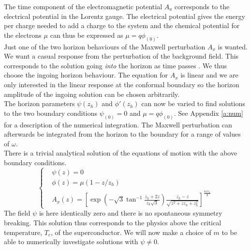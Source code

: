 \documentclass[12pt]{report}
\renewcommand{\i}{\ensuremath{i}}
\newcommand{\At}{\ensuremath{{\phi}}}
\begin{document}
The time component of the electromagnetic potential $A_a$ corresponds to the electrical potential in the Lorentz gauge. The electrical potential gives the energy per charge needed to add a charge to the system and the chemical potential for the electrons $\mu$ can thus be expressed as $\mu=q\phi_{(0)}$.\\

Just one of the two horizon behaviours of the Maxwell perturbation $A_x$ is wanted. We want a casual response from the perturbation of the background field. This corresponds to the solution going \emph{into} the horizon as time passes \cite{hartnoll8}. We thus choose the ingoing horizon behaviour. The equation for $A_x$ is linear and we are only interested in the linear response at the conformal boundary so the horizon amplitude of the ingoing solution can be chosen arbitrarily.\\

The horizon parameters $\psi(z_h)$ and $\At'(z_h)$ can now be varied to find solutions to the two boundary conditions $\psi_{(0)}=0$ and $\mu=q\phi_{(0)}$. See Appendix \ref{a:num} for a description of the numerical integration. The Maxwell perturbation can afterwards be integrated from the horizon to the boundary for a range of values of $\omega$.\\

There is a trivial analytical solution of the equations of motion with the above boundary conditions.
\begin{equation}
\begin{cases} 
 &\psi(z)=0\\
 &\phi(z)=\mu(1-z/z_h)\\
 &A_x(z)=
\left[
\exp\left( - \sqrt{3}\tan^{-1} \frac{z_h+2z}{z_h\sqrt{3}} \right)
\frac{z_h-z}{\sqrt{z^2+zz_h+z_h^2}}
\right]^{\frac{\i\omega z_h}{3} }   \label{trivial}
\end{cases}
\end{equation}
The field $\psi$ is here identically zero and there is no spontaneous symmetry breaking. This solution thus corresponds to the physics above the critical temperature, $T_c$, of the superconductor. We will now make a choice of $m$ to be able to numerically investigate solutions with $\psi\neq0$.
\end{document}
